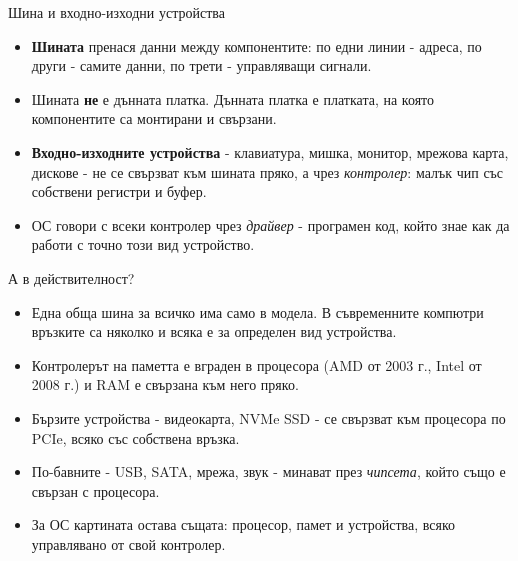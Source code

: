 \documentclass[14pt, aspectratio=169]{beamer}
\begin{document}
\begin{frame}{Шина и входно-изходни устройства}
  \begin{itemize}
    \item \textbf{Шината} пренася данни между компонентите: по едни линии -
      адреса, по други - самите данни, по трети - управляващи сигнали.
    \item Шината \textbf{не} е дънната платка. Дънната платка е платката, на
      която компонентите са монтирани и свързани.
    \item \textbf{Входно-изходните устройства} - клавиатура, мишка, монитор,
      мрежова карта, дискове - не се свързват към шината пряко, а чрез
      \emph{контролер}: малък чип със собствени регистри и буфер.
    \item ОС говори с всеки контролер чрез \emph{драйвер} - програмен код,
      който знае как да работи с точно този вид устройство.
  \end{itemize}
\end{frame}

\begin{frame}{А в действителност?}
  \begin{itemize}
    \item Една обща шина за всичко има само в модела. В съвременните компютри
      връзките са няколко и всяка е за определен вид устройства.
    \item Контролерът на паметта е вграден в процесора (AMD от 2003 г., Intel
      от 2008 г.) и RAM е свързана към него пряко.
    \item Бързите устройства - видеокарта, NVMe SSD - се свързват към
      процесора по PCIe, всяко със собствена връзка.
    \item По-бавните - USB, SATA, мрежа, звук - минават през \emph{чипсета},
      който също е свързан с процесора.
    \item За ОС картината остава същата: процесор, памет и устройства, всяко
      управлявано от свой контролер.
  \end{itemize}
\end{frame}
\end{document}
